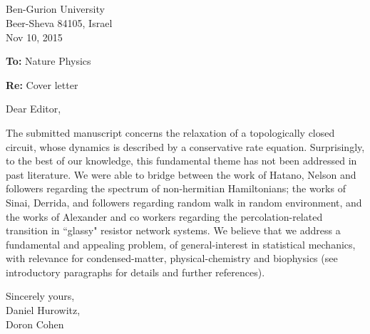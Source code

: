 \documentclass[12pt]{article}
\newcommand{\hide}[1]{}
\newcommand{\mpg}[2][1.0\hsize]{\begin{minipage}[b]{#1}{#2}\end{minipage}}
\newcommand{\putgraph}[2][0.30\hsize]{\texttt{[image: \#2]}}
\begin{document}
 



\mpg[0.65\hsize]{\ \hide{\putgraph[0.85\hsize]{bgu_head}} \\ \ \\ \ \\ \ \\ }
%
\mpg[0.3\hsize]{
Ben-Gurion University \\
Beer-Sheva 84105, Israel \\
Nov 10, 2015
}

\noindent
{\bf To:} Nature Physics

\noindent
{\bf Re:} Cover letter

\vspace*{8mm}

\noindent
Dear Editor,

\vspace*{3mm}

The submitted manuscript concerns the relaxation of a topologically closed circuit, whose dynamics is described by a conservative rate equation. Surprisingly, to the best of our knowledge, this fundamental theme has not been addressed in past literature. We were able to bridge between the work of Hatano, Nelson and followers regarding the spectrum of non-hermitian Hamiltonians; the works of Sinai, Derrida, and followers regarding random walk in random environment, and the works of Alexander and co workers regarding the percolation-related transition in ``glassy" resistor network systems. We believe that we address a fundamental and appealing 
problem, of general-interest in statistical mechanics, with relevance for condensed-matter, physical-chemistry and biophysics (see introductory paragraphs for details and further references).   

\vspace*{6mm}

\hspace*{0.7\hsize}
%
\mpg[0.3\hsize]{
Sincerely yours, \\ 
\hide{\putgraph[3cm]{signtr_eng} \\} 
\hspace*{2mm} Daniel Hurowitz, \\
\hspace*{2mm} Doron Cohen }
\end{document}
